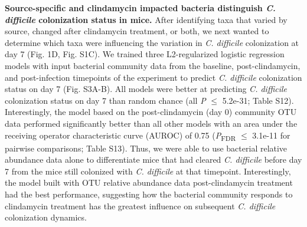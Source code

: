\documentclass[11pt,]{article}
\begin{document}
\textbf{Source-specific and clindamycin impacted bacteria distinguish
\emph{C. difficile} colonization status in mice.} After identifying taxa
that varied by source, changed after clindamycin treatment, or both, we
next wanted to determine which taxa were influencing the variation in
\emph{C. difficile} colonization at day 7 (Fig. 1D, Fig. S1C). We
trained three L2-regularized logistic regression models with input
bacterial community data from the baseline, post-clindamycin, and
post-infection timepoints of the experiment to predict \emph{C.
difficile} colonization status on day 7 (Fig. S3A-B). All models were
better at predicting \emph{C. difficile} colonization status on day 7
than random chance (all \emph{P} \(\le\) 5.2e-31; Table S12).
Interestingly, the model based on the post-clindamycin (day 0) community
OTU data performed significantly better than all other models with an
area under the receiving operator characteristic curve (AUROC) of 0.75
(\emph{P}\textsubscript{FDR} \(\le\) 3.1e-11 for pairwise comparisons;
Table S13). Thus, we were able to use bacterial relative abundance data
alone to differentiate mice that had cleared \emph{C. difficile} before
day 7 from the mice still colonized with \emph{C. difficile} at that
timepoint. Interestingly, the model built with OTU relative abundance
data post-clindamycin treatment had the best performance, suggesting how
the bacterial community responds to clindamycin treatment has the
greatest influence on subsequent \emph{C. difficile} colonization
dynamics.
\end{document}
